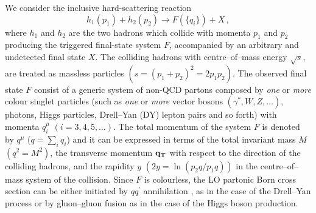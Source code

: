 \documentclass[12pt]{article}
\def\to{\rightarrow}
\def\qt{q_T}
\begin{document}
We consider the inclusive hard-scattering reaction 
\begin{equation}
h_1(p_1)+h_2(p_2)\to F(\{q_i\})+X\, ,
\label{class}
\end{equation}
where $h_1$ and $h_2$ are the two hadrons which collide with momenta $p_1$ and $p_2$ producing the triggered final-state system $F$, accompanied by an arbitrary and undetected final state $X$. The colliding hadrons with centre--of--mass energy $\sqrt s$, are treated as massless particles $(s= (p_1+p_2)^2 = 2p_1p_2)$. The observed final state $F$ consist of a generic system of non-QCD partons composed by {\em one} or {\em more} colour singlet particles (such as {\em one} or {\em more} vector bosons $(\gamma^*, W, Z, \dots)$, photons, Higgs particles, Drell--Yan (DY) lepton pairs and so forth) with momenta $q_i^{\mu}$ $(i=3,4,5,\dots)$. The total momentum of the system $F$ is denoted by $q^{\mu}$ ($q=\sum_i q_i$) and it can be expressed in terms of the total invariant mass $M$ $(q^2=M^2)$, the transverse momentum $\bf \qt$ with respect to the direction of the colliding hadrons, and the rapidity $y$ $(2y = \ln (p_2q/p_1q))$ in the centre--of--mass system of the collision. 
Since $F$ is colourless, the LO partonic Born cross section can be either initiated by $qq^{\prime}$ annihilation
, as in the case of the Drell--Yan process or by gluon--gluon fusion as in the case of the Higgs boson production.
\end{document}
